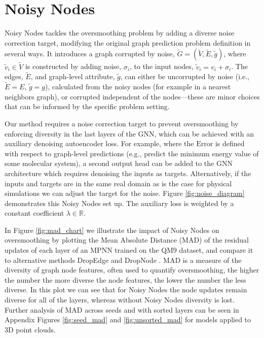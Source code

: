\documentclass{article} \usepackage{iclr2022_conference,times}
\newcommand{\R}{\mathbb{R}}
\begin{document}
\section{Noisy Nodes}

Noisy Nodes tackles the oversmoothing problem by adding a diverse noise correction target, modifying the original graph prediction problem definition in several ways. It introduces a graph corrupted by noise, $\tilde{G} = (\tilde{V}, \tilde{E}, \tilde{g})$, where $\tilde{v}_i \in \tilde{V}$ is constructed by adding noise, $\sigma_i$, to the input nodes, $\tilde{v}_i = v_i + \sigma_i$. The edges, $\tilde{E}$, and graph-level attribute, $\tilde{g}$, can either be uncorrupted by noise (i.e., $\tilde{E}=E$, $\tilde{g}=g$), calculated from the noisy nodes (for example in a nearest neighbors graph), or corrupted independent of the nodes---these are minor choices that can be informed by the specific problem setting.

Our method requires a noise correction target to prevent oversmoothing by enforcing diversity in the last layers of the GNN, which can be achieved with an auxiliary denoising autoencoder loss. For example, where the $\text{Error}$ is defined with respect to graph-level predictions (e.g., predict the minimum energy value of some molecular system), a second output head can be added to the GNN architecture which requires denoising the inputs as targets. Alternatively, if the inputs and targets are in the same real domain as is the case for physical simulations we can adjust the target for the noise. Figure \ref{fig:noise_diagram} demonstrates this Noisy Nodes set up. The auxiliary loss is weighted by a constant coefficient $\lambda \in \R$. 

In Figure \ref{fig:mad_chart} we illustrate the impact of Noisy Nodes on oversmoothing by plotting the Mean Absolute Distance (MAD) \citep{Chen2020MeasuringAR} of the residual updates of each layer of an MPNN trained on the QM9 \citep{Ramakrishnan2014QuantumCS} dataset, and compare it to alternative methods DropEdge \citep{RongDropEdge2019} and DropNode \citep{Do2021GraphCN}. MAD is a measure of the diversity of graph node features, often used to quantify oversmoothing, the higher the number the more diverse the node features, the lower the number the less diverse. In this plot we can see that for Noisy Nodes the node updates remain diverse for all of the layers, whereas without Noisy Nodes diversity is lost. Further analysis of MAD across seeds and with sorted layers can be seen in Appendix Figures \ref{fig:seed_mad} and \ref{fig:unsorted_mad} for models applied to 3D point clouds.
\end{document}
